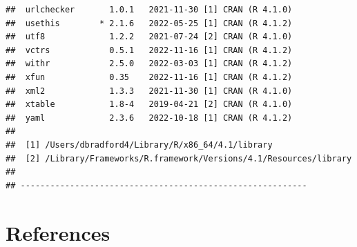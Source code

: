 \documentclass[print]{nuthesis}
\begin{document}
\begin{verbatim}
##  urlchecker       1.0.1   2021-11-30 [1] CRAN (R 4.1.0)
##  usethis        * 2.1.6   2022-05-25 [1] CRAN (R 4.1.2)
##  utf8             1.2.2   2021-07-24 [2] CRAN (R 4.1.0)
##  vctrs            0.5.1   2022-11-16 [1] CRAN (R 4.1.2)
##  withr            2.5.0   2022-03-03 [1] CRAN (R 4.1.2)
##  xfun             0.35    2022-11-16 [1] CRAN (R 4.1.2)
##  xml2             1.3.3   2021-11-30 [1] CRAN (R 4.1.0)
##  xtable           1.8-4   2019-04-21 [2] CRAN (R 4.1.0)
##  yaml             2.3.6   2022-10-18 [1] CRAN (R 4.1.2)
## 
##  [1] /Users/dbradford4/Library/R/x86_64/4.1/library
##  [2] /Library/Frameworks/R.framework/Versions/4.1/Resources/library
## 
## ----------------------------------------------------------
\end{verbatim}

\backmatter

\hypertarget{references}{%
\chapter*{References}\label{references}}

\noindent

\setlength{\parindent}{-0.20in}
\setlength{\leftskip}{0.20in}
\setlength{\parskip}{8pt}
\end{document}
